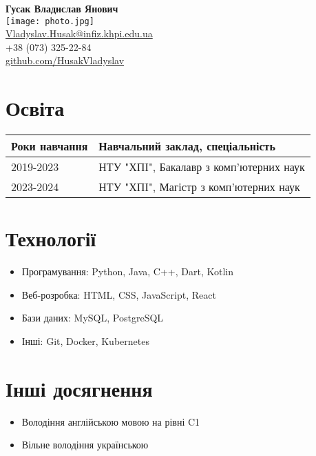 \documentclass[a4paper,12pt]{article}
\begin{document}
\begin{center}
    {\LARGE \textbf{Гусак Владислав Янович}} \\[0.5cm]
    \texttt{[image: photo.jpg]} \\[0.5cm]
    \href{mailto:Vladyslav.Husak@infiz.khpi.edu.ua}{Vladyslav.Husak@infiz.khpi.edu.ua} \\
    +38 (073) 325-22-84 \\
    \href{https://github.com/HusakVladyslav}{github.com/HusakVladyslav} \\
\end{center}

\section*{Освіта}
\begin{tabular}{|p{}|p{}|}
    \hline
    \textbf{Роки навчання} & \textbf{Навчальний заклад, спеціальність} \\
    \hline
    2019-2023 & НТУ "ХПІ", Бакалавр з комп'ютерних наук\\
    \hline
    2023-2024 &  НТУ "ХПІ", Магістр з комп'ютерних наук \\
    \hline
\end{tabular}

\section*{Технології}
\begin{itemize}
    \item Програмування: Python, Java, C++, Dart, Kotlin
    \item Веб-розробка: HTML, CSS, JavaScript, React
    \item Бази даних: MySQL, PostgreSQL
    \item Інші: Git, Docker, Kubernetes
\end{itemize}

\section*{Інші досягнення}
\begin{itemize}
    \item Володіння англійською мовою на рівні C1
    \item Вільне володіння українською
\end{itemize}
\end{document}
